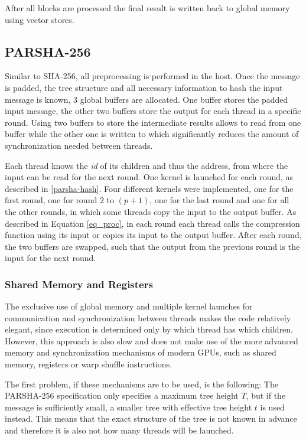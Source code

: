 \documentclass[letterpaper]{article}
\begin{document}
After all blocks are processed the final result is written back to global memory using vector stores.

\subsection{PARSHA-256}
Similar to SHA-256, all preprocessing is performed in the host. Once the message is padded, the tree structure and all necessary information to hash the input message is known, 3 global buffers are allocated. One buffer stores the padded input message, the other two buffers store the output for each thread in a specific round. Using two buffers to store the intermediate results allows to read from one buffer while the other one is written to which significantly reduces the amount of synchronization needed between threads.

Each thread knows the \emph{id} of its children and thus the address, from where the input can be read for the next round. One kernel is launched for each round, as described in \ref{parsha-hash}. Four different kernels were implemented, one for the first round, one for round 2 to $(p+1)$, one for the last round and one for all the other rounds, in which some threads copy the input to the output buffer. As described in Equation \ref{eq_proc},  in each round each thread calls the compression function using its input or copies its input to the output buffer. After each round, the two buffers are swapped, such that the output from the previous round is the input for the next round. 

\subsubsection{Shared Memory and Registers}\label{optimzations}
The exclusive use of global memory and multiple kernel launches for communication and synchronization between threads makes the code relatively elegant, since execution is determined only by which thread has which children. However, this approach is also slow and does not make use of the more advanced memory and synchronization mechanisms of modern GPUs, such as shared memory, registers or warp shuffle instructions.

The first problem, if these mechanisms are to be used, is the following: The PARSHA-256 specification only specifies a maximum tree height $T$, but if the message is sufficiently small, a smaller tree with effective tree height $t$ is used instead. This means that the exact structure of the tree is not known in advance and therefore it is also not how many threads will be launched.
\end{document}
